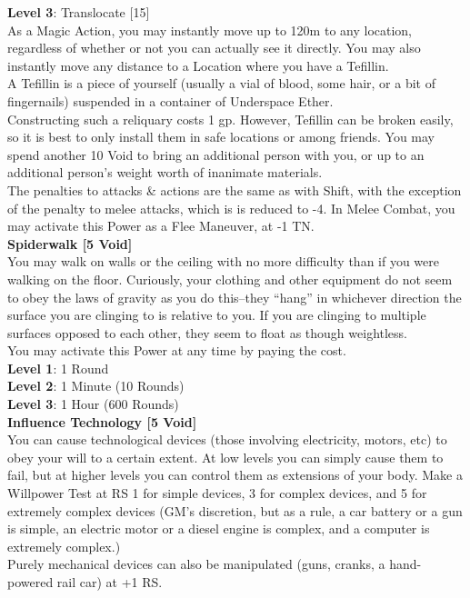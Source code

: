 \documentclass[a4paper, twocolumn, openany]{book}
\newlength{\indentlen}
\newcommand{\tabto}[1]{\setlength{\leftskip}{#1\indentlen}}
\begin{document}
{			\tabto{3}
			{\bfseries Level 3}: Translocate [15]\\
			As a Magic Action, you may instantly move up to 120m to any location,
			regardless of whether or not you can actually see it directly. You may also
			instantly move any distance to a Location where you have a Tefillin.\\
			A Tefillin is a piece of yourself (usually a vial of blood, some hair, or a bit
			of fingernails) suspended in a container of Underspace Ether.\\
			Constructing such a reliquary costs 1 gp. However, Tefillin can be broken
			easily, so it is best to only install them in safe locations or among friends.
			You may spend another 10 Void to bring an additional person with you, or
			up to an additional person’s weight worth of inanimate materials.\\
			The penalties to attacks \& actions are the same as with Shift, with the
			exception of the penalty to melee attacks, which is is reduced to -4. In
			Melee Combat, you may activate this Power as a Flee Maneuver, at -1
			TN.\\

\tabto{0}
{\bfseries\large Spiderwalk [5 Void]\\}
You may walk on walls or the ceiling with no more difficulty than if you were walking on the floor.
Curiously, your clothing and other equipment do not seem to obey the laws of gravity as you do
this--they “hang” in whichever direction the surface you are clinging to is relative to you. If you
are clinging to multiple surfaces opposed to each other, they seem to float as though
weightless.\\
You may activate this Power at any time by paying the cost.\\

	\tabto{1}
	{\bfseries Level 1}: 1 Round\\

		\tabto{2}
		{\bfseries Level 2}: 1 Minute (10 Rounds)\\

			\tabto{3}
			{\bfseries Level 3}: 1 Hour (600 Rounds)\\

\tabto{0}
{\bfseries\large Influence Technology [5 Void]\\}
You can cause technological devices (those involving electricity, motors, etc) to obey your will to
a certain extent. At low levels you can simply cause them to fail, but at higher levels you can
control them as extensions of your body. Make a Willpower Test at RS 1 for simple devices, 3
for complex devices, and 5 for extremely complex devices (GM’s discretion, but as a rule, a car
battery or a gun is simple, an electric motor or a diesel engine is complex, and a computer is
extremely complex.)\\
Purely mechanical devices can also be manipulated (guns, cranks, a hand-powered rail car) at
+1 RS.\\

}
\end{document}
